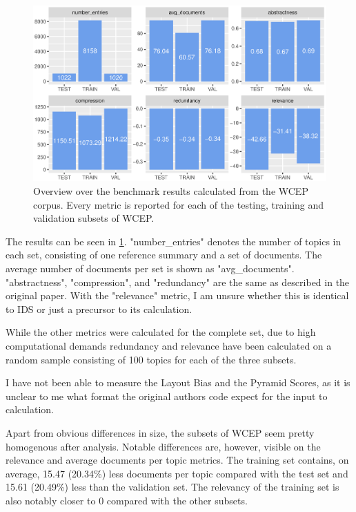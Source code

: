 \documentclass[../main.tex]{subfiles}
\begin{document}
\begin{figure}
    \includegraphics[width=\textwidth]{figures/analysis.eps}
    \caption{Overview over the benchmark results calculated from the WCEP corpus. Every metric is reported for each of the testing, training and validation subsets of WCEP.} \label{fig:analysis}
\end{figure}

The results can be seen in \ref{fig:analysis}. "number\_entries" denotes the number of topics in each set, consisting of one reference summary and a set of documents.
The average number of documents per set is shown as "avg\_documents". "abstractness", "compression", and "redundancy" are the same as described in the original paper.
With the "relevance" metric, I am unsure whether this is identical to IDS or just a precursor to its calculation.

While the other metrics were calculated for the complete set, due to high computational demands redundancy and relevance have been calculated on a random sample consisting of 100 topics for each of the three subsets.

I have not been able to measure the Layout Bias and the Pyramid Scores, as it is unclear to me what format the original authors code expect for the input to calculation.

Apart from obvious differences in size, the subsets of WCEP seem pretty homogenous after analysis.
Notable differences are, however, visible on the relevance and average documents per topic metrics.
The training set contains, on average, 15.47 (20.34\%) less documents per topic compared with the test set and 15.61 (20.49\%) less than the validation set.
The relevancy of the training set is also notably closer to 0 compared with the other subsets.
\end{document}
